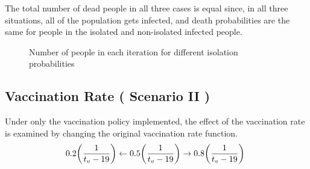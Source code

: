 \documentclass{article}
\begin{document}
The total number of dead people in all three cases is equal since, in all three situations, all of the population gets infected, and death probabilities are the same for people in the isolated and non-isolated infected people.

\begin{figure}[h]
    \centering
    \qquad
    \qquad
    \caption{Number of people in each iteration for different isolation probabilities}
    \label{fig:AlterQSSC1PerIter}%
\end{figure}

\newpage

\subsection*{Vaccination Rate ( Scenario II )}

\; \; Under only the vaccination policy implemented, the effect of the vaccination rate is examined by changing the original vaccination rate function. 
$$
\\0.2\bigg(\frac{1}{t_v-19}\bigg)\leftarrow0.5\bigg(\frac{1}{t_v-19}\bigg)\rightarrow 0.8\bigg(\frac{1}{t_v-19}\bigg)\
$$
\end{document}

